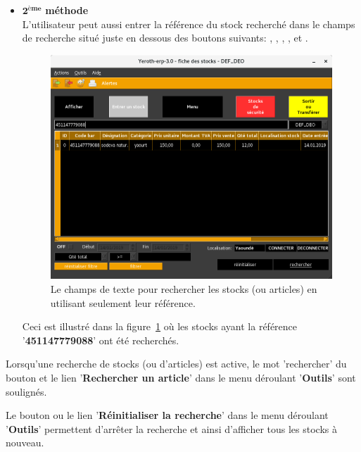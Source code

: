 \begin{itemize}[]
	\newpage	
	
	\item \textcolor{purplish}{$\mathbf{2^{\text{\`eme}}}$ \textbf{m\'ethode}}\\
	L'utilisateur peut aussi entrer la r\'ef\'erence
	du stock recherch\'e dans le champs	de recherche
	situ\'e juste en dessous des boutons
	suivants: , ,
	, , et .\\
		
	\begin{figure}[!htbp]
		\centering
		\includegraphics[scale=0.63]{images/yeren-fenetre-rechercher-stock-par-reference.png}
		\caption{Le champs de texte pour
			rechercher les stocks (ou articles) en utilisant
			seulement leur r\'ef\'erence.}\label{fig:yeren-fenetre-rechercher-stock-par-reference}
	\end{figure}
	
	Ceci est illustr\'e dans la figure~\ref{fig:yeren-fenetre-rechercher-stock-par-reference}
	o\`u les stocks ayant la r\'ef\'erence '\textbf{451147779088}'
	ont \'et\'e recherch\'es.\\	
\end{itemize}

Lorsqu'une recherche de stocks (ou d'articles) est active,
le mot 'rechercher' du bouton  et
le lien '\textbf{Rechercher un article}' dans le
menu d\'eroulant '\textbf{Outils}' sont soulign\'es.
	
Le bouton  ou le lien
'\textbf{R\'einitialiser la recherche}' dans le menu 
d\'eroulant '\textbf{Outils}' permettent d'arr\^eter
la recherche et ainsi d'afficher tous les stocks
\`a nouveau.

